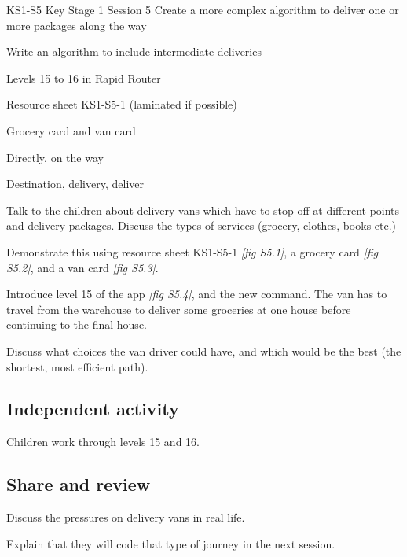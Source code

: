 \documentclass{../../../lessonplan}
\begin{document}
\lessonplantitle
    {KS1-S5}
    {Key Stage 1 Session 5}
    {Create a more complex algorithm to deliver one or more packages along the way}

\preamble
    {
    \item Write an algorithm to include intermediate deliveries 
    }
    {
    \item Levels 15 to 16 in Rapid Router
    \item Resource sheet KS1-S5-1 (laminated if possible)
    \item Grocery card and van card
    }
    {
    \item Directly, on the way
    \item Destination, delivery, deliver
    }

\begin{lessonplan}

Talk to the children about delivery vans which have to stop off at different points and delivery packages.
Discuss the types of services (grocery, clothes, books etc.)

Demonstrate this using resource sheet KS1-S5-1 \textit{[fig S5.1]}, a grocery card \textit{[fig S5.2]}, and a van card \textit{[fig S5.3]}. 




Introduce level 15 of the app \textit{[fig S5.4]}, and the new  command.
The van has to travel from the warehouse to deliver some groceries at one house before continuing to the final house.


 Discuss what choices the van driver could have, and which would be the best (the shortest, most efficient path).

\subsection*{Independent activity}

Children work through levels 15 and 16.

\subsection*{Share and review}

Discuss the pressures on delivery vans in real life.

Explain that they will code that type of journey in the next session.

\end{lessonplan}
\end{document}
